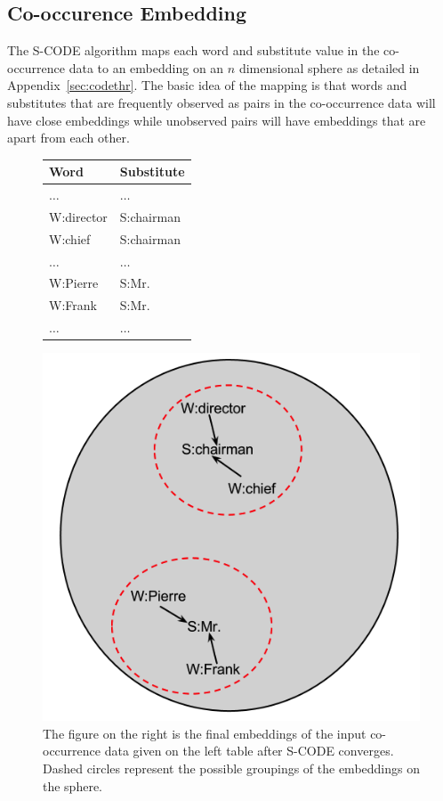 \subsection{Co-occurence Embedding}
\label{sec:embedding}
The S-CODE algorithm maps each word and substitute value in the
co-occurrence data to an embedding on an $n$ dimensional sphere as
detailed in Appendix~\ref{sec:codethr}.  The basic idea of the mapping
is that words and substitutes that are frequently observed as pairs in
the co-occurrence data will have close embeddings while unobserved
pairs will have embeddings that are apart from each other.
\begin{figure}[ht]
\centering
  \begin{minipage}[c]{0.38\textwidth}
    \begin{tabular}{|l|l|}
    \hline
    \textbf{Word} & \textbf{Substitute} \\
    \hline
    $\hdots$&$\hdots$\\
    W:director & S:chairman \\
    W:chief & S:chairman \\
    $\hdots$&$\hdots$\\
    W:Pierre & S:Mr. \\
    W:Frank & S:Mr. \\
    $\hdots$&$\hdots$\\
    \hline
  \end{tabular}
  \end{minipage}
  \begin{minipage}[c]{0.48\textwidth}
    \includegraphics[height=\textwidth]{scode-ex.png}
  \end{minipage}
  \caption{The figure on the right is the final embeddings of the
    input co-occurrence data given on the left table after S-CODE
    converges.  Dashed circles represent the possible groupings of the
    embeddings on the sphere.}
  \label{fig:scodeexample}
\end{figure}

